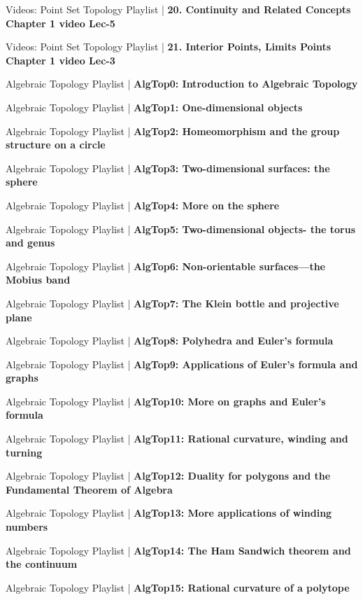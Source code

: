 \documentclass[a4, landscape, 12pt]{article}
\newcommand{\checkbox}{$\square$}%
\begin{document}
\begin{itemize}
{{}
\item [\checkbox] Videos: Point Set Topology Playlist  | \textbf{20. Continuity and Related Concepts  Chapter 1 video Lec-5
}
\item [\checkbox] Videos: Point Set Topology Playlist  | \textbf{21. Interior Points, Limits Points  Chapter 1 video Lec-3
}
\item [\checkbox] Algebraic Topology Playlist  | \textbf{AlgTop0: Introduction to Algebraic Topology
}
\item [\checkbox] Algebraic Topology Playlist  | \textbf{AlgTop1: One-dimensional objects
}
\item [\checkbox] Algebraic Topology Playlist  | \textbf{AlgTop2: Homeomorphism and the group structure on a circle
}
\item [\checkbox] Algebraic Topology Playlist  | \textbf{AlgTop3: Two-dimensional surfaces: the sphere
}
\item [\checkbox] Algebraic Topology Playlist  | \textbf{AlgTop4: More on the sphere
}
\item [\checkbox] Algebraic Topology Playlist  | \textbf{AlgTop5: Two-dimensional objects- the torus and genus
}
\item [\checkbox] Algebraic Topology Playlist  | \textbf{AlgTop6: Non-orientable surfaces---the Mobius band
}
\item [\checkbox] Algebraic Topology Playlist  | \textbf{AlgTop7: The Klein bottle and projective plane
}
\item [\checkbox] Algebraic Topology Playlist  | \textbf{AlgTop8: Polyhedra and Euler's formula
}
\item [\checkbox] Algebraic Topology Playlist  | \textbf{AlgTop9: Applications of Euler's formula and graphs
}
\item [\checkbox] Algebraic Topology Playlist  | \textbf{AlgTop10: More on graphs and Euler's formula
}
\item [\checkbox] Algebraic Topology Playlist  | \textbf{AlgTop11: Rational curvature, winding and turning
}
\item [\checkbox] Algebraic Topology Playlist  | \textbf{AlgTop12: Duality for polygons and the Fundamental Theorem of Algebra
}
\item [\checkbox] Algebraic Topology Playlist  | \textbf{AlgTop13: More applications of winding numbers
}
\item [\checkbox] Algebraic Topology Playlist  | \textbf{AlgTop14: The Ham Sandwich theorem and the continuum
}
\item [\checkbox] Algebraic Topology Playlist  | \textbf{AlgTop15: Rational curvature of a polytope
}}
\end{itemize}
\end{document}
